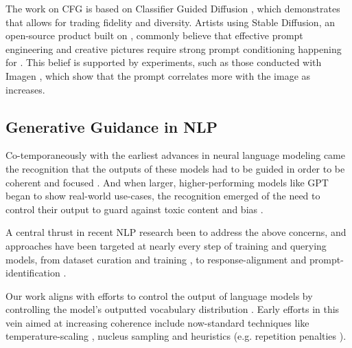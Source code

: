 \documentclass{article}
\begin{document}
The work on CFG is based on Classifier Guided Diffusion \cite{guidance}, which demonstrates that  allows for trading fidelity and diversity. Artists using Stable Diffusion, an open-source product built on \cite{latentdiffusion}, commonly believe that effective prompt engineering and creative pictures require strong prompt conditioning happening for . This belief is supported by experiments, such as those conducted with Imagen \cite{imagen}, which show that the prompt correlates more with the image as  increases.

\subsection{Generative Guidance in NLP}

Co-temporaneously with the earliest advances in neural language modeling \cite{gers2000learning} came the recognition that the outputs of these models had to be guided in order to be coherent \cite{barzilay2008modeling} and focused \cite{holtzman2019curious}. And when larger, higher-performing models like GPT \cite{radford2019language, brown2020language} began to show real-world use-cases, the recognition emerged of the need to control their output \cite{solaiman2019release} to guard against toxic content \cite{gehman2020realtoxicityprompts} and bias \cite{felkner2022towards}. 

A central thrust in recent NLP research been to address the above concerns, and approaches have been targeted at nearly every step of training and querying models, from dataset curation \cite{falcon40b} and training \cite{keskar2019ctrl}, to response-alignment \cite{ouyang2022training} and prompt-identification \cite{gehman2020realtoxicityprompts}.

Our work aligns with efforts to control the output of language models by controlling the model's outputted vocabulary distribution . Early efforts in this vein aimed at increasing coherence include now-standard techniques like temperature-scaling \cite{chorowski2016towards}, nucleus sampling \cite{holtzman2019curious} and heuristics (e.g. repetition penalties \cite{fu2021theoretical}). 
\end{document}

